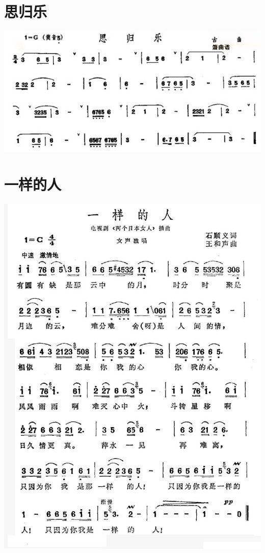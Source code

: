 \documentclass[cn,pad,chinese,chinesefont=nofont]{elegantbook}
\begin{document}
\section{思归乐}
\includegraphics[width=\textwidth]{dongxiao/思归乐.jpg}
\section{一样的人}
\includegraphics[height=\textheight]{dongxiao/日本-一样的人.jpg}
\end{document}
